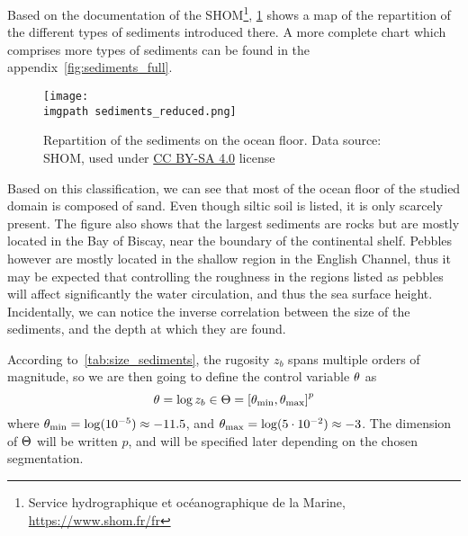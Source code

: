 \documentclass[../../Main_ManuscritThese.tex]{subfiles}
\newcommand{\zob}{z_b}
\newcommand\imgpath{/home/victor/acadwriting/Manuscrit/Text/Chapter5/img/}
\begin{document}
Based on the documentation of the SHOM\footnote{Service hydrographique
  et océanographique de la Marine, \url{https://www.shom.fr/fr}},
\cref{fig:sediments_reduced} shows a map of the repartition of the
different types of sediments introduced there. A more complete chart
which comprises more types of sediments can be found in the
appendix~\cref{fig:sediments_full}.
\begin{figure}[ht]
  \centering
  \texttt{[image: \\imgpath sediments\_reduced.png]}
  \caption[Repartition of the sediments
    on the ocean floor]{\label{fig:sediments_reduced} Repartition of the sediments
    on the ocean floor. Data source: SHOM, used under \href{https://creativecommons.org/licenses/by-sa/4.0/}{CC BY-SA 4.0} license}
\end{figure}


Based on this classification, we can see that most of the ocean floor
of the studied domain is composed of sand. Even though siltic soil is listed,
it is only scarcely present. The figure also shows that the largest
sediments are rocks but are mostly located in the Bay of Biscay, near
the boundary of the continental shelf. Pebbles however are mostly
located in the shallow region in the English Channel, thus it may be
expected that controlling the roughness in the regions listed as
pebbles will affect significantly the water circulation, and thus the sea
surface height. Incidentally, we can notice the inverse correlation
between the size of the sediments, and the depth at which they are
found.

According to~\cref{tab:size_sediments}, the rugosity $\zob$ spans
multiple orders of magnitude, so we are then going to define the control
variable $\theta$ as
\begin{equation}
  \kk = \log \zob \in \Kspace = \interval{\kk_{\min}}{\kk_{\max}}^p
\end{equation}
where $\theta_{\min} = \log(10^{-5}) \approx -11.5$, and
$\theta_{\max} = \log(5\cdot 10^{-2}) \approx -3$.  The dimension of
$\Theta$ will be written $p$, and will be specified later depending on the
chosen segmentation.
\end{document}
